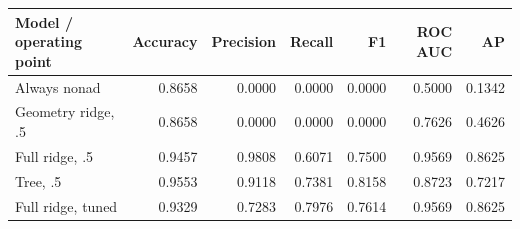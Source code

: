 \begin{tabular}{lrrrrrr}\toprule
Model / operating point & Accuracy & Precision & Recall & F1 & ROC AUC & AP\\\midrule
Always nonad & 0.8658 & 0.0000 & 0.0000 & 0.0000 & 0.5000 & 0.1342\\
Geometry ridge, .5 & 0.8658 & 0.0000 & 0.0000 & 0.0000 & 0.7626 & 0.4626\\
Full ridge, .5 & 0.9457 & 0.9808 & 0.6071 & 0.7500 & 0.9569 & 0.8625\\
Tree, .5 & 0.9553 & 0.9118 & 0.7381 & 0.8158 & 0.8723 & 0.7217\\
Full ridge, tuned & 0.9329 & 0.7283 & 0.7976 & 0.7614 & 0.9569 & 0.8625\\
\bottomrule\end{tabular}
